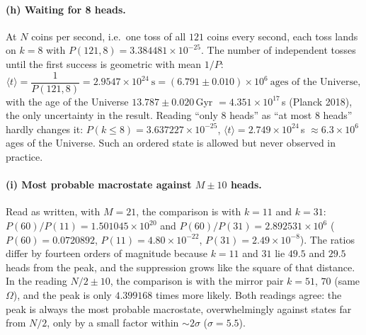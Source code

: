 \paragraph{(h) Waiting for 8 heads.} At $N$ coins per second, i.e.\ one toss of all $121$ coins every second, each toss lands on $k=8$ with $P(121,8)=3.384481\times10^{-25}$. The number of independent tosses until the first success is geometric with mean $1/P$:
\begin{equation}
\langle t\rangle=\frac{1}{P(121,8)}=2.9547\times10^{24}\ \text{s}=(6.791\pm0.010)\times10^{6}\ \text{ages of the Universe},
\end{equation}
with the age of the Universe $13.787\pm0.020$\,Gyr $=4.351\times10^{17}$\,s (Planck 2018), the only uncertainty in the result. Reading ``only 8 heads'' as ``at most 8 heads'' hardly changes it: $P(k\le8)=3.637227\times10^{-25}$, $\langle t\rangle=2.749\times10^{24}$\,s $\approx6.3\times10^{6}$ ages of the Universe. Such an ordered state is allowed but never observed in practice.

\paragraph{(i) Most probable macrostate against $M\pm10$ heads.} Read as written, with $M=21$, the comparison is with $k=11$ and $k=31$: $P(60)/P(11)=1.501045\times10^{20}$ and $P(60)/P(31)=2.892531\times10^{6}$ ($P(60)=0.0720892$, $P(11)=4.80\times10^{-22}$, $P(31)=2.49\times10^{-8}$). The ratios differ by fourteen orders of magnitude because $k=11$ and $31$ lie $49.5$ and $29.5$ heads from the peak, and the suppression grows like the square of that distance. In the reading $N/2\pm10$, the comparison is with the mirror pair $k=51$, $70$ (same $\Omega$), and the peak is only $4.399168$ times more likely. Both readings agree: the peak is always the most probable macrostate, overwhelmingly against states far from $N/2$, only by a small factor within $\sim2\sigma$ ($\sigma=5.5$).
